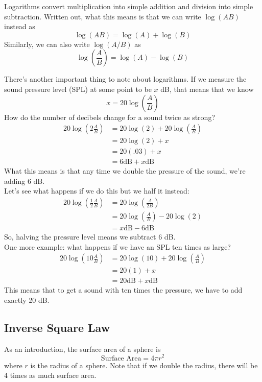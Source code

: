 \documentclass[a4paper]{article}
\begin{document}
Logarithms convert multiplication into simple addition and division into simple
subtraction. Written out, what this means is that we can write $\log(AB)$
instead as
\[
	\log(AB) = \log(A) + \log(B)
\]
Similarly, we can also write $\log(A/B)$ as
\[
	\log\left(\frac{A}{B}\right) = \log(A) - \log(B)
\]

There's another important thing to note about logarithms. If we measure the
sound pressure level (SPL) at some point to be $x$ dB, that means that we know
\[
	x = 20\log\left(\frac{A}{B}\right)
\]
How do the number of decibels change for a sound twice as strong?
\begin{align*}
	20\log\left(2\frac{A}{B}\right)
	&= 20\log(2) + 20\log\left(\frac{A}{B}\right)\\
	&= 20\log(2) + x\\
	&= 20(.03) + x\\
	&= 6 \mathrm{dB} + x \mathrm{dB}
\end{align*}
What this means is that any time we double the pressure of the sound, we're
adding $6$ dB.\\
Let's see what happens if we do this but we half it instead:
\begin{align*}
	20\log\left(\frac{1}{2}\frac{A}{B}\right) &= 
	20\log\left(\frac{A}{2B}\right)\\
	&= 20\log\left(\frac{A}{B}\right) - 20\log(2)\\
	&= x \mathrm{dB} - 6 \mathrm{dB}
\end{align*}
So, halving the pressure level means we subtract $6$ dB.\\
One more example: what happens if we have an SPL ten times as large?
\begin{align*}
	20\log\left(10\frac{A}{B}\right) &=
	20\log(10) + 20\log\left(\frac{A}{B}\right)\\
	&= 20(1) + x\\
	&= 20 \mathrm{dB} + x \mathrm{dB}
\end{align*}
This means that to get a sound with ten times the pressure, we have to add
exactly 20 dB.

\subsection{Inverse Square Law}
As an introduction, the surface area of a sphere is
\[
	\text{Surface Area} = 4\pi r^2
\]
where $r$ is the radius of a sphere. Note that if we double the radius, there
will be 4 times as much surface area.
\end{document}
